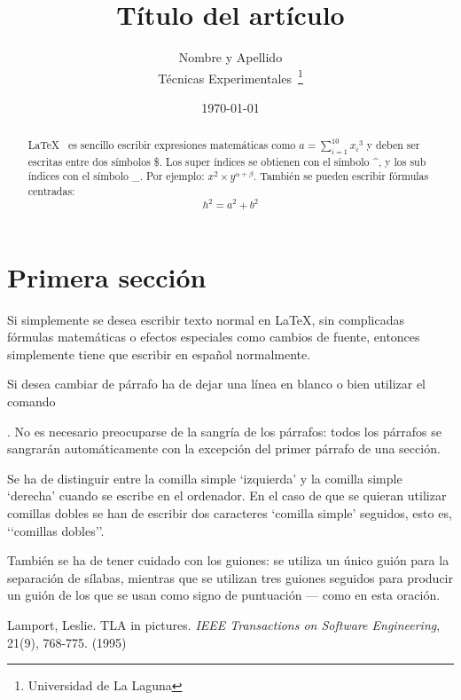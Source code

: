 \documentclass[a4paper,12pt]{article}
\begin{document}
\title{Título del artículo}
\author{Nombre y Apellido \\
Técnicas Experimentales~\footnote{Universidad de La Laguna}
}
\date{\today}
\maketitle
\begin{abstract}
\LaTeX{}~\cite{Lam:86} es sencillo escribir expresiones
matemáticas como $a=\sum_{i=1}^{10} {x_i}^{3}$
y deben ser escritas entre dos símbolos \$.
Los super índices se obtienen con el símbolo \^{}, y
los sub índices con el símbolo \_.
Por ejemplo: $x^2 \times y^{\alpha + \beta}$.
También se pueden escribir fórmulas centradas:
\[h^2=a^2 + b^2 \]
\end{abstract}

\section{Primera sección}
 Si simplemente se desea escribir texto normal en LaTeX,
 sin complicadas f\'ormulas matem\'aticas o efectos especiales 
 como cambios de fuente, entonces simplemente tiene que escribir
 en espa\~nol normalmente.\par
 Si desea cambiar de p\'arrafo ha de dejar una línea en blanco o bien
 utilizar el comando \par.
 No es necesario preocuparse de la sangría de los párrafos:
 todos los párrafos se sangrarán automáticamente con la excepción
 del primer párrafo de una sección.

 Se ha de distinguir entre la comilla simple ‘izquierda’
 y la comilla simple ‘derecha’ cuando se escribe en el ordenador.
 En el caso de que se quieran utilizar comillas dobles se han de
 escribir dos caracteres ‘comilla simple’ seguidos, esto es,
 ‘‘comillas dobles’’.

 También se ha de tener cuidado con los guiones: se utiliza un único
 guión para la separación de sílabas, mientras que se utilizan
 tres guiones seguidos para producir un guión de los que se usan
 como signo de puntuación --- como en esta oración.
\begin{thebibliography}{00}
Lamport, Leslie.
TLA in pictures.
\emph{IEEE Transactions on Software Engineering},
 21(9), 768-775.
 (1995)
 \end{thebibliography}
 
\end{document}
